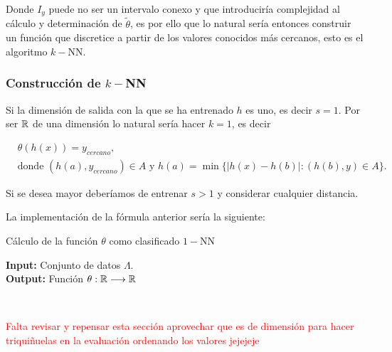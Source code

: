 Donde $I_y$ puede no ser un intervalo conexo y que introduciría complejidad al cálculo y determinación de $\tilde{\theta}$, es por ello que lo natural sería entonces construir un función que discretice a partir de los valores conocidos más cercanos, esto es el algoritmo $k-$NN.  

\subsubsection*{Construcción de $k-$NN}  

Si la dimensión de salida con la que se ha entrenado $h$ es uno, es decir $s=1$. Por ser $\mathbb{R}$ de una dimensión lo natural sería hacer $k=1$, es decir 

\begin{align}
    & \theta(h(x)) = y_{cercano}, \\
    &\text{donde } 
    (h(a),  y_{cercano}) \in A 
    \text{ y }
    h(a) = \min \{|h(x) - h(b)| :  (h(b),  y) \in A  \}.
\end{align}

Si se desea mayor deberíamos de entrenar $s > 1$ y considerar cualquier distancia. 

La implementación de la fórmula anterior sería la siguiente: 

\begin{algorithm}[H]
   \caption{ Cálculo de la función $\theta$ como clasificado $1-$NN} 
   \textbf{Input: } Conjunto de datos $\Lambda$.  \\
   \textbf{Output: } Función $\theta : \mathbb{R} \longrightarrow \mathbb{R}$
   \begin{algorithmic}[1]
    \STATE {} \\
    \Return{$\theta$}
   \end{algorithmic}
\end{algorithm}

\textcolor{red}{Falta revisar y repensar esta sección 
aprovechar que es de dimensión para hacer triquiñuelas en la evaluación ordenando los valores jejejeje}

